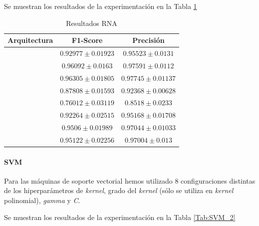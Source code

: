\documentclass[12pt]{article}
\begin{document}
Se muestran los resultados de la experimentación en la Tabla \ref{Tab:ANN_2}

\begin{table}[!ht]
	\caption{Resultados RNA}
	\centering
		 \begin{tabular}{||c c c||}
			 \hline
			 Arquitectura & F1-Score & Precisión  \\ [0.5ex]
			 \hline\hline
			 [8] & $0.92977 \pm 0.01923$ & $0.95523 \pm 0.0131$ \\
			 \hline
			 [16] & $0.96092 \pm 0.0163$ & $0.97591 \pm 0.0112$ \\
			 \hline
			 [32] & $0.96305 \pm 0.01805$ & $0.97745 \pm 0.01137$ \\
			 \hline
			 [8, 8] & $0.87808 \pm 0.01593$ & $0.92368 \pm 0.00628$ \\
			 \hline
			 [16, 4] & $0.76012 \pm 0.03119$ & $0.8518 \pm 0.0233$ \\
			 \hline
			 [16, 8] & $0.92264 \pm 0.02515$ & $0.95168 \pm 0.01708$ \\
			 \hline
			 [32, 16] & $0.9506 \pm 0.01989$ & $0.97044 \pm 0.01033$ \\
			 \hline
			 [32, 32] & $0.95122 \pm 0.02256$ & $0.97004 \pm 0.013$ \\
			 \hline
		 \end{tabular}
	\label{Tab:ANN_2}
	\end{table}

\paragraph{SVM}

Para las máquinas de soporte vectorial hemos utilizado 8 configuraciones distintas de los hiperparámetros de \textit{kernel},
grado del \textit{kernel} (sólo se utiliza en \textit{kernel} polinomial), \textit{gamma} y \textit{C}.

Se muestran los resultados de la experimentación en la Tabla \ref{Tab:SVM_2}
\end{document}
